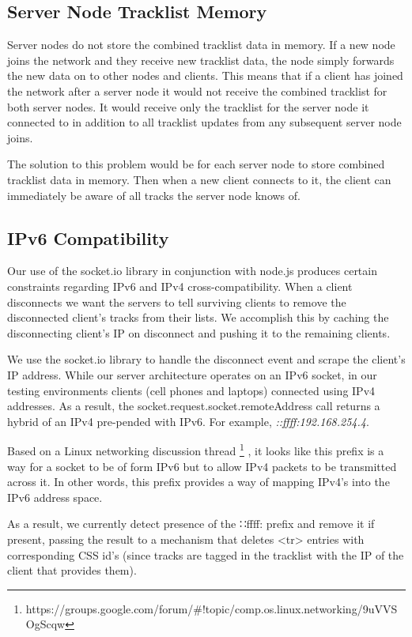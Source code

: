 \documentclass[12pt]{article}
\begin{document}
\subsection{Server Node Tracklist Memory}
Server nodes do not store the combined tracklist data in memory. If a new node joins the network and they receive new tracklist data, the node simply forwards the new data on to other nodes and clients. This means that if a client has joined the network after a server node it would not receive the combined tracklist for both server nodes. It would receive only the tracklist for the server node it connected to in addition to all tracklist updates from any subsequent server node joins.

The solution to this problem would be for each server node to store combined tracklist data in memory. Then when a new client connects to it, the client can immediately be aware of all tracks the server node knows of.

\subsection{IPv6 Compatibility}
Our use of the socket.io library in conjunction with node.js produces certain constraints regarding IPv6 and IPv4 cross-compatibility.  When a client disconnects we want the servers to tell surviving clients to remove the disconnected client's tracks from their lists. We accomplish this by caching the disconnecting client's IP on disconnect and pushing it to the remaining clients.

We use the socket.io library to handle the disconnect event and scrape the client's IP address. While our server architecture operates on an IPv6 socket, in our testing environments clients (cell phones and laptops) connected using IPv4 addresses. As a result, the socket.request.socket.remoteAddress call returns a hybrid of an IPv4 pre-pended with IPv6. For example, \textit{::ffff:192.168.254.4}.

Based on a Linux networking discussion thread \footnote{https://groups.google.com/forum/\#!topic/comp.os.linux.networking/9uVVSOgScqw} , it looks like this prefix is a way for a socket to be of form IPv6 but to allow IPv4 packets to be transmitted across it. In other words, this prefix provides a way of mapping IPv4's into the IPv6 address space.

As a result, we currently detect presence of the ∷ffff: prefix and remove it if present, passing the result to a mechanism that deletes <tr> entries with corresponding CSS id's (since tracks are tagged in the tracklist with the IP of the client that provides them).
\end{document}
